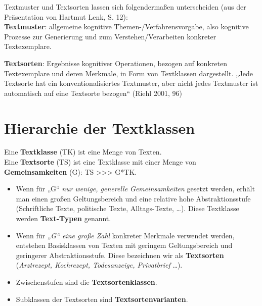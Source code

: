 \documentclass[
  letterpaper,
]{scrbook}
\begin{document}
Textmuster und Textsorten lassen sich folgendermaßen unterscheiden (aus
der Präsentation von Hartmut Lenk, S. 12):\\

\textbf{Textmuster}: allgemeine kognitive Themen-/Verfahrensvorgabe,
also kognitive Prozesse zur Generierung und zum Verstehen/Verarbeiten
konkreter Textexemplare.

\textbf{Textsorten}: Ergebnisse kognitiver Operationen, bezogen auf
konkreten Textexemplare und deren Merkmale, in Form von Textklassen
dargestellt. „Jede Textsorte hat ein konventionalisiertes Textmuster,
aber nicht jedes Textmuster ist automatisch auf eine Textsorte bezogen``
(Riehl 2001, 96)

\hypertarget{hierarchie-der-textklassen}{%
\section{Hierarchie der Textklassen}\label{hierarchie-der-textklassen}}

Eine \textbf{Textklasse} (TK) ist eine Menge von Texten.\\
Eine \textbf{Textsorte} (TS) ist eine Textklasse mit einer Menge von
\textbf{Gemeinsamkeiten} (G): TS \textgreater\textgreater\textgreater{}
G*TK.\\

\begin{itemize}
\item
  Wenn für „G`` \emph{nur wenige, generelle Gemeinsamkeiten} gesetzt
  werden, erhält man einen großen Geltungsbereich und eine relative hohe
  Abstraktionsstufe (Schriftliche Texte, politische Texte,
  Alltags-Texte, \ldots). Diese Textklasse werden \textbf{Text-Typen}
  genannt.\\
\item
  Wenn für \emph{„G`` eine große Zahl} konkreter Merkmale verwendet
  werden, entstehen Basisklassen von Texten mit geringem Geltungsbereich
  und geringerer Abstraktionsstufe. Diese bezeichnen wir als
  \textbf{Textsorten} (\emph{Arztrezept, Kochrezept, Todesanzeige,
  Privatbrief} \ldots).
\item
  Zwischenstufen sind die \textbf{Textsortenklassen}.\\
\item
  Subklassen der Textsorten sind \textbf{Textsortenvarianten}.\\
\end{itemize}
\end{document}
